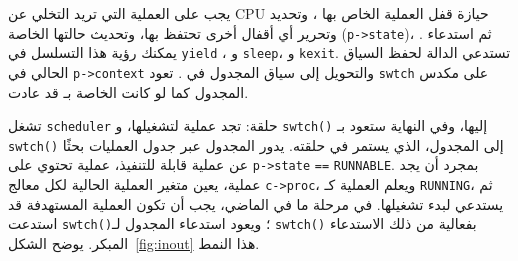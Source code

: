 يجب على العملية التي تريد التخلي عن CPU حيازة قفل العملية الخاص بها ، وتحديد وتحرير أي أقفال أخرى تحتفظ بها، وتحديث حالتها الخاصة (\lstinline{p->state})، ثم استدعاء .
يمكنك رؤية هذا التسلسل في \lstinline{yield} ، و \texttt{sleep}، و \texttt{kexit}.
تستدعي  الدالة  لحفظ السياق الحالي في \lstinline{p->context} والتحويل إلى سياق المجدول في .
تعود \lstinline{swtch} على مكدس المجدول كما لو كانت  الخاصة بـ  قد عادت.

تشغل \lstinline{scheduler} حلقة:
تجد عملية لتشغيلها، و {\tt swtch()} إليها، وفي النهاية ستعود بـ {\tt swtch()} إلى المجدول، الذي يستمر في حلقته.
يدور المجدول عبر جدول العمليات بحثًا عن عملية قابلة للتنفيذ، عملية تحتوي على \lstinline{p->state} \lstinline{==} \lstinline{RUNNABLE}.
بمجرد أن يجد عملية، يعين متغير العملية الحالية لكل معالج \lstinline{c->proc}، ويعلم العملية كـ \lstinline{RUNNING}، ثم يستدعي  لبدء تشغيلها.
في مرحلة ما في الماضي، يجب أن تكون العملية المستهدفة قد استدعت {\tt swtch()}؛ ويعود استدعاء المجدول لـ {\tt swtch()} بفعالية من ذلك الاستدعاء المبكر.
يوضح الشكل~\ref{fig:inout} هذا النمط.

